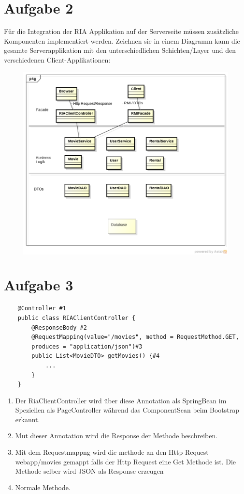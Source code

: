 \documentclass[a4paper,10pt]{scrreprt}
\begin{document}
\section*{Aufgabe 2}
Für die Integration der RIA Applikation auf der Serverseite müssen zusätzliche Komponenten
implementiert werden. Zeichnen sie in einem Diagramm kann die gesamte Serverapplikation mit den
unterschiedlichen Schichten/Layer und den verschiedenen Client-Applikationen:
\begin{figure}[h]
 \centering
 \includegraphics[scale=0.6]{./archan2.png}
\end{figure}
\section*{Aufgabe 3}
\begin{lstlisting}
	@Controller #1
	public class RIAClientController {
		@ResponseBody #2
		@RequestMapping(value="/movies", method = RequestMethod.GET,
		produces = "application/json")#3
		public List<MovieDTO> getMovies() {#4
			...
		}
	}
\end{lstlisting}
\begin{enumerate}
 \item Der RiaClientController wird über diese Annotation als SpringBean im Speziellen als PageController während das 
ComponentScan beim Bootstrap erkannt.
\item Mut dieser Annotation wird die Response der Methode beschreiben.
\item Mit dem Requestmappng wird die methode an den Http Request webapp/movies gemappt falls der Http Request eine Get 
Methode ist. Die Methode selber wird JSON als Response erzeugen
\item Normale Methode.
\end{enumerate}
\end{document}
